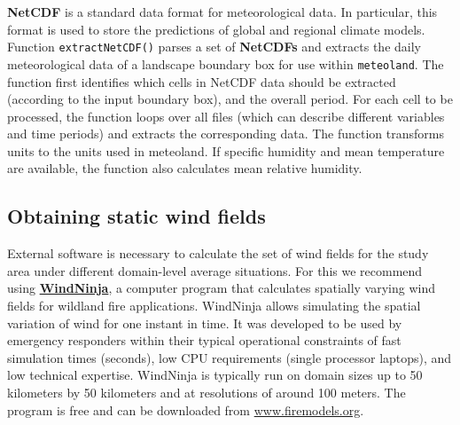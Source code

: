 \documentclass[11pt,a4paper]{article}
\begin{document}
\textbf{NetCDF} is a standard data format for meteorological data. In particular, this format is used to store the predictions of global and regional climate models. Function \texttt{extractNetCDF()} parses a set of \textbf{NetCDFs} and extracts the daily meteorological data of a landscape boundary box for use within \texttt{meteoland}. The function first identifies which cells in NetCDF data should be extracted (according to the input boundary box), and the overall period. For each cell to be processed, the function loops over all files (which can describe different variables and time periods) and extracts the corresponding data. The function transforms units to the units used in meteoland. If specific humidity and mean temperature are available, the function also calculates mean relative humidity.

\subsection{Obtaining static wind fields}
External software is necessary to calculate the set of wind fields for the study area under different domain-level average situations. For this we recommend using \textbf{\href{http://firelab.org/project/windninja}{WindNinja}}, a computer program that calculates spatially varying wind fields for wildland fire applications. WindNinja allows simulating the spatial variation of wind for one instant in time. It was developed to be used by emergency responders within their typical operational constraints of fast simulation times (seconds), low CPU requirements (single processor laptops), and low technical expertise. WindNinja is typically run on domain sizes up to 50 kilometers by 50 kilometers and at resolutions of around 100 meters. The program is free and can be downloaded from \href{http://www.firemodels.org}{www.firemodels.org}.
\end{document}
